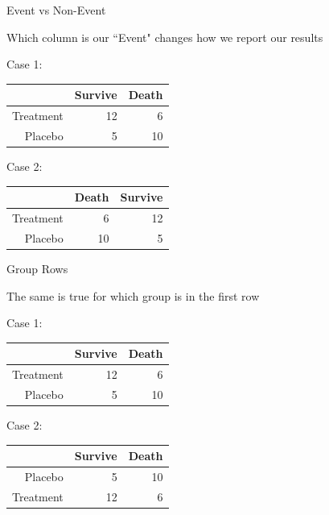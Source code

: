 \documentclass{beamer}
\begin{document}
\begin{frame}{Event vs Non-Event}

Which column is our ``Event" changes how we report our results \\ \vspace{4mm}

Case 1: 
\begin{table}[ht]
\centering
\begin{tabular}{|r|r|r|}
  \hline
 & Survive & Death \\ 
  \hline
Treatment & 12 & 6 \\ \hline
Placebo & 5  & 10 \\
   \hline
\end{tabular}
\end{table}

Case 2: 
\begin{table}[ht]
\centering
\begin{tabular}{|r|r|r|}
  \hline
 & Death & Survive \\ 
  \hline
Treatment & 6 & 12 \\ \hline
Placebo & 10  & 5 \\
   \hline
\end{tabular}
\end{table}
\end{frame}

\begin{frame}{Group Rows}

The same is true for which group is in the first row \\ \vspace{4mm}

Case 1: 
\begin{table}[ht]
\centering
\begin{tabular}{|r|r|r|}
  \hline
 & Survive & Death \\ 
  \hline
Treatment & 12 & 6 \\ \hline
Placebo & 5  & 10 \\
   \hline
\end{tabular}
\end{table}

Case 2: 
\begin{table}[ht]
\centering
\begin{tabular}{|r|r|r|}
  \hline
 & Survive & Death \\ 
  \hline
Placebo & 5  & 10 \\ \hline
Treatment & 12 & 6 \\
   \hline
\end{tabular}
\end{table}
\end{frame}
\end{document}

